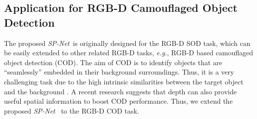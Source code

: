 \documentclass[10pt,twocolumn,letterpaper]{article}
\def\eg{\emph{e.g.}}
\def\ours{\emph{SP-Net}}
\begin{document}
\subsection{Application for RGB-D Camouflaged Object Detection}
\label{COD_enten}

The proposed \ours~is originally designed for the RGB-D SOD task, which can be easily extended to other related RGB-D tasks, \eg, RGB-D based camouflaged object detection (COD). The aim of COD is to identify objects that are ``seamlessly” embedded in their background surroundings. Thus, it is a very challenging task due to the high intrinsic similarities between the target object and the background \cite{fan2021concealed,sun2021context,lim2021}. A recent research \cite{zhang2021depth} suggests that depth can also provide useful spatial information to boost COD performance. Thus, we extend the proposed \ours~ to the RGB-D COD task.
\end{document}
